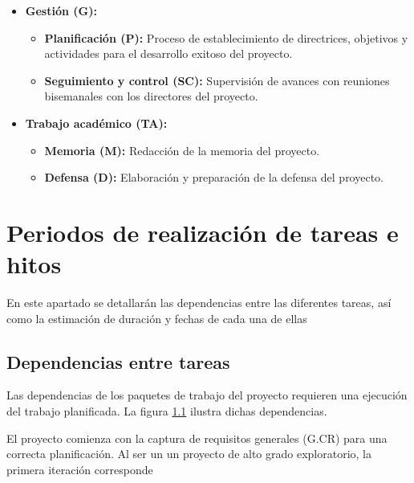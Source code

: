\begin{itemize}
\begin{itemize}
\begin{itemize}
        \end{itemize}
    \end{itemize}
  \item\textbf{Gestión (G): }
    \begin{itemize}
      \item\textbf{Planificación (P): }Proceso de establecimiento de directrices, objetivos y actividades para el desarrollo exitoso del proyecto.
      \item\textbf{Seguimiento y control (SC): }Supervisión de avances con reuniones bisemanales con los directores del proyecto.
    \end{itemize}
  \item\textbf{Trabajo académico (TA): }
    \begin{itemize}
      \item\textbf{Memoria (M): }Redacción de la memoria del proyecto. 
      \item\textbf{Defensa (D): }Elaboración y preparación de la defensa del proyecto.
    \end{itemize}
\end{itemize}

\section{Periodos de realización de tareas e hitos}
En este apartado se detallarán las dependencias entre las diferentes tareas, así como la estimación de duración y fechas de cada una de ellas

\subsection{Dependencias entre tareas}
Las dependencias de los paquetes de trabajo del proyecto requieren una ejecución del trabajo planificada. La figura \ref{} ilustra dichas dependencias.

El proyecto comienza con la captura de requisitos generales (G.CR) para una correcta planificación. Al ser un un proyecto de alto grado exploratorio, la primera iteración corresponde  







